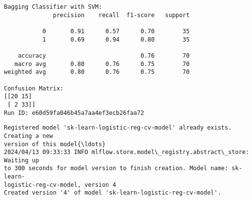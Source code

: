 \documentclass[11pt]{article}
\begin{document}
    \begin{Verbatim}[commandchars=\\\{\}]
Bagging Classifier with SVM:
              precision    recall  f1-score   support

           0       0.91      0.57      0.70        35
           1       0.69      0.94      0.80        35

    accuracy                           0.76        70
   macro avg       0.80      0.76      0.75        70
weighted avg       0.80      0.76      0.75        70

Confusion Matrix:
[[20 15]
 [ 2 33]]
Run ID: e60d59fa046b45a7aa4ef3ecb26faa72
    \end{Verbatim}

    \begin{Verbatim}[commandchars=\\\{\}]
Registered model 'sk-learn-logistic-reg-cv-model' already exists. Creating a new
version of this model{\ldots}
2024/04/13 09:33:33 INFO mlflow.store.model\_registry.abstract\_store: Waiting up
to 300 seconds for model version to finish creation. Model name: sk-learn-
logistic-reg-cv-model, version 4
Created version '4' of model 'sk-learn-logistic-reg-cv-model'.
    \end{Verbatim}
\end{document}
